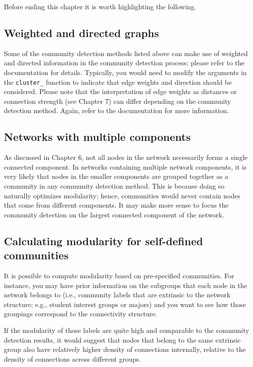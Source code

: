 \documentclass[
]{book}
\begin{document}
Before ending this chapter it is worth highlighting the following.

\subsection{Weighted and directed graphs}\label{weighted-and-directed-graphs}

Some of the community detection methods listed above can make use of weighted and directed information in the community detection process; please refer to the documentation for details. Typically, you would need to modify the arguments in the \texttt{cluster\_} function to indicate that edge weights and direction should be considered. Please note that the interpretation of edge weights as distances or connection strength (see Chapter 7) can differ depending on the community detection method. Again, refer to the documentation for more information.

\subsection{Networks with multiple components}\label{networks-with-multiple-components}

As discussed in Chapter 6, not all nodes in the network necessarily forms a single connected component. In networks containing multiple network components, it is very likely that nodes in the smaller components are grouped together as a community in any community detection method. This is because doing so naturally optimizes modularity; hence, communities would never contain nodes that come from different components. It may make more sense to focus the community detection on the largest connected component of the network.

\subsection{Calculating modularity for self-defined communities}\label{calculating-modularity-for-self-defined-communities}

It is possible to compute modularity based on pre-specified communities. For instance, you may have prior information on the subgroups that each node in the network belongs to (i.e., community labels that are extrinsic to the network structure; e.g., student interest groups or majors) and you want to see how those groupings correspond to the connectivity structure.

If the modularity of those labels are quite high and comparable to the community detection results, it would suggest that nodes that belong to the same extrinsic group also have relatively higher density of connections internally, relative to the density of connections across different groups.
\end{document}
